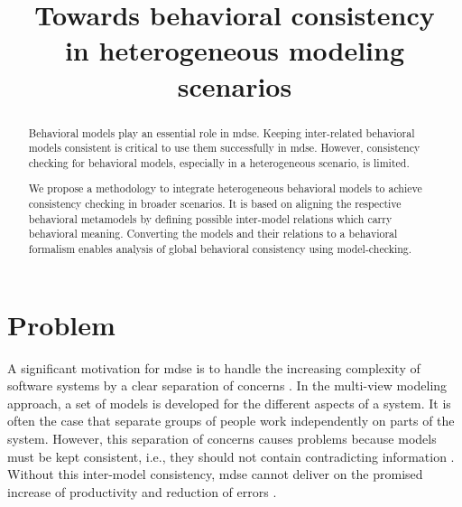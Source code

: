 \documentclass[conference]{IEEEtran}
\begin{document}
\title{Towards behavioral consistency \\ in heterogeneous modeling scenarios}

\author{
}


\maketitle

\begin{abstract}
Behavioral models play an essential role in \gls{mdse}.
Keeping inter-related behavioral models consistent is critical to use them successfully in \gls{mdse}. 
However, consistency checking for behavioral models, especially in a heterogeneous scenario, is limited.

We propose a methodology to integrate heterogeneous behavioral models to achieve consistency checking in broader scenarios.
It is based on aligning the respective behavioral metamodels by defining possible inter-model relations which carry behavioral meaning.
Converting the models and their relations to a behavioral formalism enables analysis of global behavioral consistency using model-checking. 
\end{abstract}


\IEEEpeerreviewmaketitle



\section{Problem}
A significant motivation for \gls{mdse} is to handle the increasing complexity of software systems by a clear separation of concerns \cite{franceModeldrivenDevelopmentComplex2007}.
In the multi-view modeling approach, a set of models is developed for the different aspects of a system.
It is often the case that separate groups of people work independently on parts of the system.
However, this separation of concerns causes problems because models must be kept consistent, i.e., they should not contain contradicting information \cite{cicchettiMultiviewApproachesSoftware2019}.
Without this inter-model consistency, \gls{mdse} cannot deliver on the promised increase of productivity and reduction of errors \cite{brambillaModeldrivenSoftwareEngineering2017}.
\end{document}

